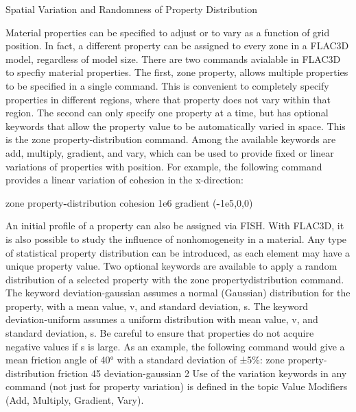 \documentclass[a4paper, nobind]{templates/ociamthesis}
\newenvironment{Shaded}{\begin{snugshade}}{\end{snugshade}}
\newcommand{\BuiltInTok}[1]{#1}
\newcommand{\DecValTok}[1]{\textcolor[rgb]{0.00,0.00,0.81}{#1}}
\newcommand{\FloatTok}[1]{\textcolor[rgb]{0.00,0.00,0.81}{#1}}
\newcommand{\NormalTok}[1]{#1}
\newcommand{\OperatorTok}[1]{\textcolor[rgb]{0.81,0.36,0.00}{\textbf{#1}}}
\renewenvironment{Shaded}
{
  \vspace{10pt}%
  \begin{snugshade}%
}{%
  \end{snugshade}%
  \vspace{8pt}%
}
\begin{document}
Spatial Variation and Randomness of Property Distribution

Material properties can be specified to adjust or to vary as a function
of grid position. In fact, a different property can be assigned to every
zone in a FLAC3D model, regardless of model size. There are two commands
avialable in FLAC3D to specfiy material properties. The first, zone
property, allows multiple properties to be specified in a single
command. This is convenient to completely specify properties in
different regions, where that property does not vary within that region.
The second can only specify one property at a time, but has optional
keywords that allow the property value to be automatically varied in
space. This is the zone property-distribution command. Among the
available keywords are add, multiply, gradient, and vary, which can be
used to provide fixed or linear variations of properties with position.
For example, the following command provides a linear variation of
cohesion in the x-direction:

\begin{Shaded}
\begin{Highlighting}[]
\NormalTok{zone }\BuiltInTok{property}\OperatorTok{{-}}\NormalTok{distribution cohesion }\FloatTok{1e6}\NormalTok{ gradient (}\OperatorTok{{-}}\FloatTok{1e5}\NormalTok{,}\DecValTok{0}\NormalTok{,}\DecValTok{0}\NormalTok{)}
\end{Highlighting}
\end{Shaded}

An initial profile of a property can also be assigned via FISH. With
FLAC3D, it is also possible to study the influence of nonhomogeneity in
a material. Any type of statistical property distribution can be
introduced, as each element may have a unique property value. Two
optional keywords are available to apply a random distribution of a
selected property with the zone propertydistribution command. The
keyword deviation-gaussian assumes a normal (Gaussian) distribution for
the property, with a mean value, v, and standard deviation, s. The
keyword deviation-uniform assumes a uniform distribution with mean
value, v, and standard deviation, s. Be careful to ensure that
properties do not acquire negative values if s is large. As an example,
the following command would give a mean friction angle of 40° with a
standard deviation of ±5\%: zone property-distribution friction 45
deviation-gaussian 2 Use of the variation keywords in any command (not
just for property variation) is defined in the topic Value Modifiers
(Add, Multiply, Gradient, Vary).
\end{document}
